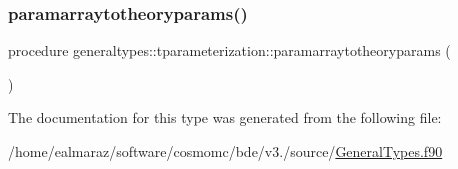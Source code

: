 \mbox{\label{structgeneraltypes_1_1tparameterization_a1edd08d8a22408f2ed61517beb259921}} 
\subsubsection{\texorpdfstring{paramarraytotheoryparams()}{paramarraytotheoryparams()}}
{\footnotesize\ttfamily procedure generaltypes\+::tparameterization\+::paramarraytotheoryparams (\begin{DoxyParamCaption}{ }\end{DoxyParamCaption})\hspace{0.3cm}{\ttfamily [private]}}



The documentation for this type was generated from the following file\+:\begin{DoxyCompactItemize}
\item 
/home/ealmaraz/software/cosmomc/bde/v3./source/\mbox{\hyperlink{GeneralTypes_8f90}{General\+Types.\+f90}}\end{DoxyCompactItemize}
